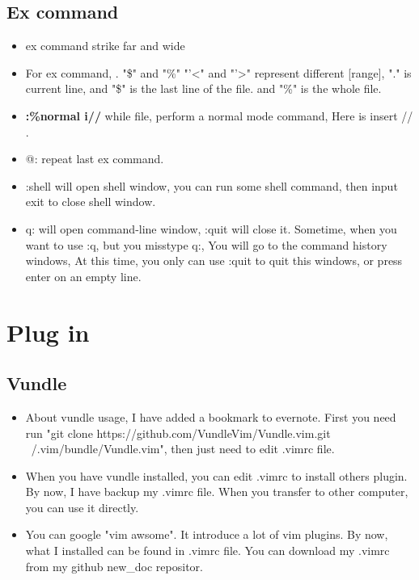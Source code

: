 \documentclass[a4paper,12pt,twoside]{book}
\begin{document}
\subsection{Ex command}
\begin{itemize}
		\item ex command strike far and wide
		
		\item  For ex command, . "\$" and "\%"  "'<"  and "'>" represent different [range], "." is current line, and "\$" is the last line of the file. and "\%" is the whole file.
		
		\item \textbf{:\%normal i//} while file, perform a normal mode command, Here is insert // . 

		\item @: repeat last ex command.
		
		\item :shell will open shell window, you can run some shell command, then input exit to close shell window. 
		
		\item q: will open command-line window, :quit will close it. Sometime, when you want to use :q, but you misstype q:, You will go to the command history windows, At this time, you only can use :quit to quit this windows, or press enter on an empty line.

\end{itemize}

\section{Plug in}

\subsection{Vundle}
\begin{itemize}
		\item About vundle usage, I have added a bookmark to evernote. First you need run "git clone https://github.com/VundleVim/Vundle.vim.git ~/.vim/bundle/Vundle.vim", then just need to edit .vimrc file.  

		\item When you have vundle installed, you can edit .vimrc to install others plugin. By now, I have backup my .vimrc file. When you transfer to other computer, you can use it directly. 

		\item You can google "vim awsome". It introduce a lot of vim plugins. By now, what I installed can be found in .vimrc file. You can download my .vimrc from my github new\_doc repositor.
		\end{itemize}
\end{document}
